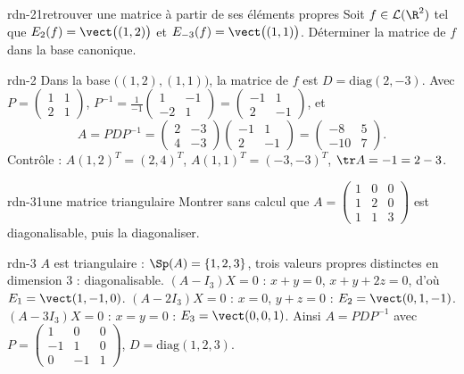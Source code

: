 \begin{exo}{rdn-2}{1}{retrouver une matrice à partir de ses éléments propres}
Soit $f\in\mathcal L(\R^2)$ tel que $E_2(f)=\vect\big((1,2)\big)$ et $E_{-3}(f)=\vect\big((1,1)\big)$. Déterminer la matrice de $f$
dans la base canonique.
\end{exo}
\begin{corrige}{rdn-2}
Dans la base $\big((1,2),(1,1)\big)$, la matrice de $f$ est $D=\mathrm{diag}(2,-3)$. Avec $P=\begin{pmatrix}1&1\\2&1\end{pmatrix}$,
$P^{-1}=\frac1{-1}\begin{pmatrix}1&-1\\-2&1\end{pmatrix}=\begin{pmatrix}-1&1\\2&-1\end{pmatrix}$, et
\[A=PDP^{-1}=\begin{pmatrix}2&-3\\4&-3\end{pmatrix}\begin{pmatrix}-1&1\\2&-1\end{pmatrix}=\begin{pmatrix}-8&5\\-10&7\end{pmatrix}.\]
Contrôle : $A(1,2)^T=(2,4)^T$, $A(1,1)^T=(-3,-3)^T$, $\tr A=-1=2-3$.
\end{corrige}

\begin{exo}{rdn-3}{1}{une matrice triangulaire}
Montrer sans calcul que $A=\begin{pmatrix}1&0&0\\1&2&0\\1&1&3\end{pmatrix}$ est diagonalisable, puis la diagonaliser.
\end{exo}
\begin{corrige}{rdn-3}
$A$ est triangulaire : $\Sp(A)=\{1,2,3\}$, trois valeurs propres distinctes en dimension $3$ : diagonalisable.
$(A-I_3)X=0$ : $x+y=0$, $x+y+2z=0$, d'où $E_1=\vect(1,-1,0)$. $(A-2I_3)X=0$ : $x=0$, $y+z=0$ : $E_2=\vect(0,1,-1)$.
$(A-3I_3)X=0$ : $x=y=0$ : $E_3=\vect(0,0,1)$. Ainsi $A=PDP^{-1}$ avec
$P=\begin{pmatrix}1&0&0\\-1&1&0\\0&-1&1\end{pmatrix}$, $D=\mathrm{diag}(1,2,3)$.
\end{corrige}

